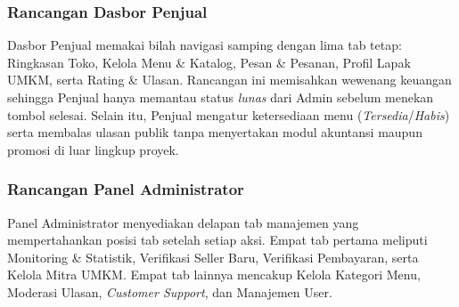 \subsubsection{Rancangan Dasbor Penjual}
Dasbor Penjual memakai bilah navigasi samping dengan lima tab tetap: Ringkasan Toko, Kelola Menu \& Katalog, Pesan \& Pesanan, Profil Lapak UMKM, serta Rating \& Ulasan. Rancangan ini memisahkan wewenang keuangan sehingga Penjual hanya memantau status \textit{lunas} dari Admin sebelum menekan tombol selesai. Selain itu, Penjual mengatur ketersediaan menu (\textit{Tersedia}/\textit{Habis}) serta membalas ulasan publik tanpa menyertakan modul akuntansi maupun promosi di luar lingkup proyek.

\subsubsection{Rancangan Panel Administrator}
Panel Administrator menyediakan delapan tab manajemen yang mempertahankan posisi tab setelah setiap aksi. Empat tab pertama meliputi Monitoring \& Statistik, Verifikasi Seller Baru, Verifikasi Pembayaran, serta Kelola Mitra UMKM. Empat tab lainnya mencakup Kelola Kategori Menu, Moderasi Ulasan, \textit{Customer Support}, dan Manajemen User.
